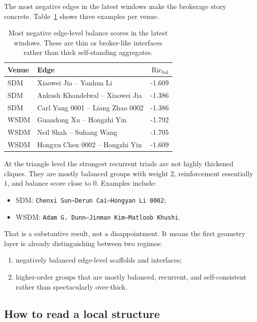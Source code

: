 \documentclass[11pt]{article}
\newcommand{\Ric}{\mathrm{Ric}}
\begin{document}
The most negative edges in the latest windows make the brokerage story concrete. Table~\ref{tab:brokerage} shows three examples per venue.

\begin{table}[ht]
\centering
\begin{tabular}{>{\raggedright\arraybackslash}p{} >{\raggedright\arraybackslash}p{} r}
\toprule
Venue & Edge & $\Ric_{\mathrm{bal}}$ \\
\midrule
SDM & Xiaowei Jia -- Yanhua Li & -1.609 \\
SDM & Ankush Khandelwal -- Xiaowei Jia & -1.386 \\
SDM & Carl Yang 0001 -- Liang Zhao 0002 & -1.386 \\
WSDM & Guandong Xu -- Hongzhi Yin & -1.792 \\
WSDM & Neil Shah -- Suhang Wang & -1.705 \\
WSDM & Hongxu Chen 0002 -- Hongzhi Yin & -1.609 \\
\bottomrule
\end{tabular}
\caption{Most negative edge-level balance scores in the latest windows. These are thin or broker-like interfaces rather than thick self-standing aggregates.}
\label{tab:brokerage}
\end{table}

At the triangle level the strongest recurrent triads are not highly thickened cliques. They are mostly balanced groups with weight $2$, reinforcement essentially $1$, and balance score close to $0$. Examples include:
\begin{itemize}
    \item SDM: \texttt{Chenxi Sun--Derun Cai--Hongyan Li 0002};
    \item WSDM: \texttt{Adam G. Dunn--Jinman Kim--Matloob Khushi}.
\end{itemize}
That is a substantive result, not a disappointment. It means the first geometry layer is already distinguishing between two regimes:
\begin{enumerate}[label=(\alph*)]
        \item negatively balanced edge-level scaffolds and interfaces;
    \item higher-order groups that are mostly balanced, recurrent, and self-consistent rather than spectacularly over-thick.
\end{enumerate}

\subsection{How to read a local structure}
\end{document}
